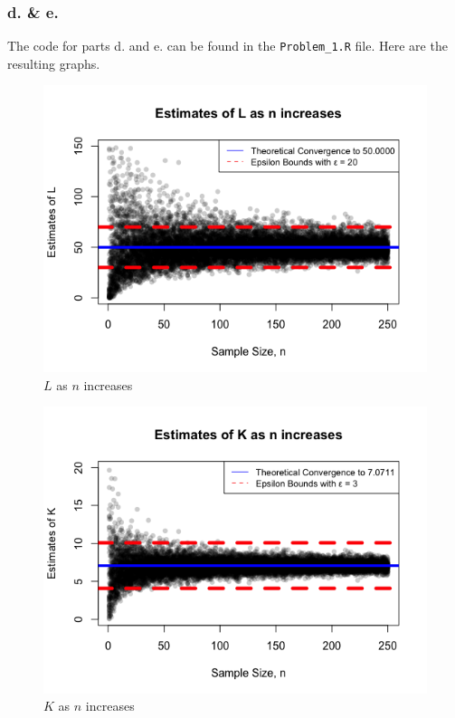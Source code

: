 \documentclass[12pt]{article}
\begin{document}
\subsubsection{d. \& e.}

The code for parts d. and e. can be found in the \lstinline{Problem_1.R} file. Here are the resulting graphs.



\begin{figure}[H]
	\centering
	\includegraphics{img/n_vs_Ln.png}
	\caption{$L$ as $n$ increases}
\end{figure}

\begin{figure}[H]
	\centering
	\includegraphics{img/n_vs_Kn.png}
	\caption{$K$ as $n$ increases}
\end{figure}
\end{document}
